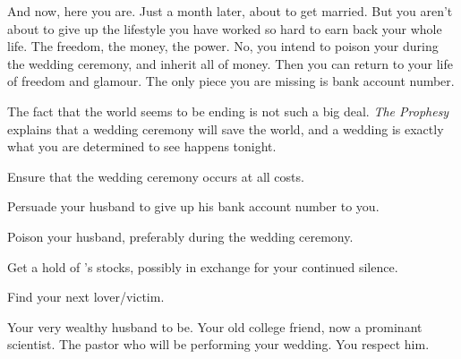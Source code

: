 \documentclass[char]{guildcamp1}
\begin{document}
And now, here you are. Just a month later, about to get married. But you aren't about to give up the lifestyle you have worked so hard to earn back your whole life. The freedom, the money, the power. No, you intend to poison your \cGroomA{\spouse} during the wedding ceremony, and inherit all of \cGroomA{\their} money. Then you can return to your life of freedom and glamour.  The only piece you are missing is \cGroomA{\their} bank account number. 

The fact that the world seems to be ending is not such a big deal. {\em The Prophesy} explains that a wedding ceremony will save the world, and a wedding is exactly what you are determined to see happens tonight.

\begin{itemz}[Goals]
  \item Ensure that the wedding ceremony occurs at all costs.
  \item Persuade your husband to give up his bank account number to you.
  \item Poison your husband, preferably during the wedding ceremony.
  \item Get a hold of \cRival{}'s stocks, possibly in exchange for your continued silence.
  \item Find your next lover/victim.
\end{itemz}

\begin{contacts}
  \contact{\cGroomA{}} Your very wealthy husband to be. 
  \contact{\cRival{}} Your old college friend, now a prominant scientist.
  \contact{\cPastor{}} The pastor who will be performing your wedding. You respect him.
  \end{contacts}
\end{document}
